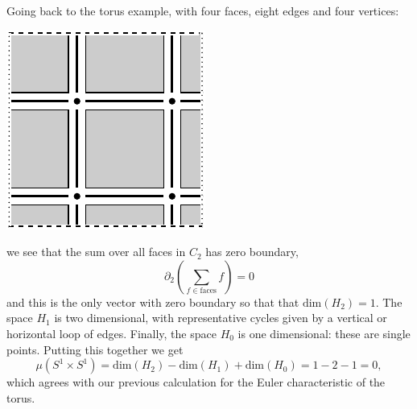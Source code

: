 \documentclass[11pt,twoside,openright]{report}
\def\Im{\mathrm{im}}
\def\Ker{\mathrm{ker}}
\def\Dim{\mathrm{dim}}
\def\euler{\mu}
\begin{document}
Going back to the torus example, with four faces,
eight edges and four vertices:
\begin{center}
\includegraphics{pic-torus-hom.pdf}
\end{center}
we see that the sum over all faces in $C_2$
has zero boundary,
$$
    \partial_2(\sum_{f\in\text{faces}} f) = 0
$$
and this is the only vector with zero boundary so that
that $\Dim(H_2)=1$.
The space $H_1$ is two dimensional, with representative
cycles given by a vertical or horizontal loop of edges.
Finally, the space $H_0$ is one dimensional: these
are single points.
Putting this together we get
$$
    \euler(S^1\times S^1) = 
    \mbox{dim}(H_2) - \mbox{dim}(H_1) + \mbox{dim}(H_0) = 1-2-1 = 0,
$$
which agrees with our previous calculation for the Euler
characteristic of the torus.

\end{document}
